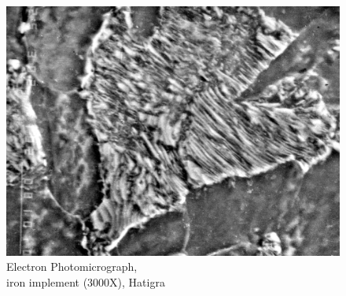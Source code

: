 \begin{figure}[H]
\renewcommand{\thefigure}{18C}
\includegraphics[scale=0.6]{images/chapter-4/fig018C.jpg}
\caption{Electron Photomicrograph,\\ iron implement (3000X), Hatigra }\label{chapter-4-fig18C}
\end{figure}

